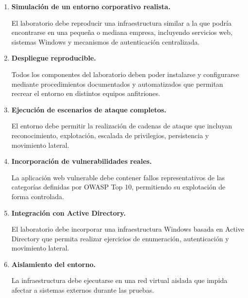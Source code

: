 \begin{enumerate}

\item \textbf{Simulación de un entorno corporativo realista.}

El laboratorio debe reproducir una infraestructura similar a la que podría encontrarse en una pequeña o mediana empresa, incluyendo servicios web, sistemas Windows y mecanismos de autenticación centralizada.

\item \textbf{Despliegue reproducible.}

Todos los componentes del laboratorio deben poder instalarse y configurarse mediante procedimientos documentados y automatizados que permitan recrear el entorno en distintos equipos anfitriones.

\item \textbf{Ejecución de escenarios de ataque completos.}

El entorno debe permitir la realización de cadenas de ataque que incluyan reconocimiento, explotación, escalada de privilegios, persistencia y movimiento lateral.

\item \textbf{Incorporación de vulnerabilidades reales.}

La aplicación web vulnerable debe contener fallos representativos de las categorías definidas por OWASP Top 10, permitiendo su explotación de forma controlada.

\item \textbf{Integración con Active Directory.}

El laboratorio debe incorporar una infraestructura Windows basada en Active Directory que permita realizar ejercicios de enumeración, autenticación y movimiento lateral.

\item \textbf{Aislamiento del entorno.}

La infraestructura debe ejecutarse en una red virtual aislada que impida afectar a sistemas externos durante las pruebas.


\end{enumerate}




